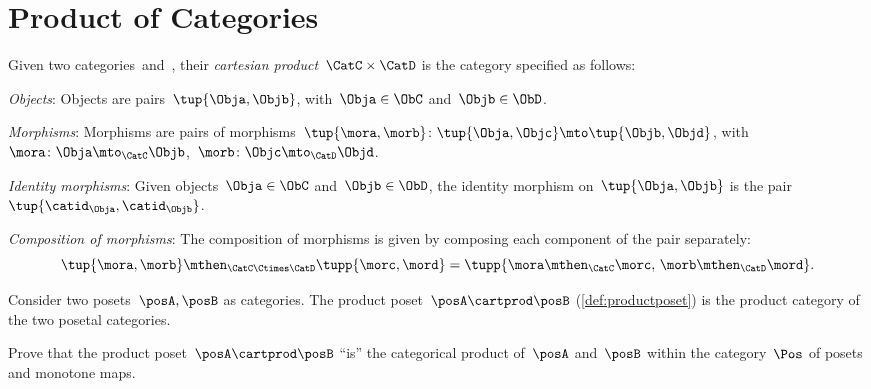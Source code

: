 
\section{Product of Categories}

\begin{ctdefinition}
    \label{def:cartesian-product-category}
    Given two categories~\CatC and~\CatD, their \emph{cartesian product}~$\CatC \times \CatD$ is the category specified as follows:
    \begin{compactenum}
        \item \emph{Objects}: Objects are pairs~$\tup{\Obja,\Objb}$, with~$\Obja\in \ObC$ and~$\Objb\in \ObD$.
        \item \emph{Morphisms}: Morphisms are pairs of morphisms~$\tup{\mora,\morb} \colon \tup{\Obja,\Objc}\mto \tup{\Objb,\Objd}$, with~$\mora\colon \Obja \mto_\CatC \Objb$,~$\morb\colon \Objc\mto_\CatD \Objd$.
        \item \emph{Identity morphisms}: Given objects~$\Obja\in \ObC$ and~$\Objb\in \ObD$, the identity morphism on~$\tup{\Obja,\Objb}$ is the pair $\tup{\catid_\Obja ,\catid_\Objb}$.
        \item \emph{Composition of morphisms}: The composition of morphisms is given by composing each component of the pair separately:
        \begin{equation}
            \tup{\mora,\morb}\mthen_{\CatC\Ctimes\CatD} \tupp{\morc,\mord}=\tupp{\mora\mthen_{\CatC}\morc,\, \morb \mthen_{\CatD} \mord}.
        \end{equation}
    \end{compactenum}
\end{ctdefinition}

\begin{example}
    Consider two posets~$\posA,\posB$ as categories.
    The product poset~$\posA\cartprod \posB$ (\cref{def:productposet}) is the product category of the two posetal categories.
\end{example}

\begin{gradedexercise}
    Prove that the product poset~$\posA \cartprod \posB$ ``is'' the categorical product of~$\posA$ and~$\posB$ within the category~$\Pos$ of posets and monotone maps.
\end{gradedexercise}

